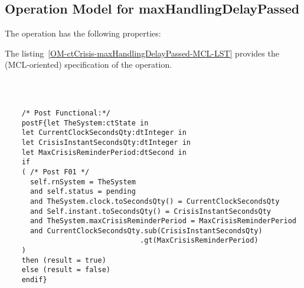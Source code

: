 \subsection{Operation Model for maxHandlingDelayPassed}

\label{OM-maxHandlingDelayPassed}


The  operation has the following properties:

	\begin{operationmodel}



		


	\end{operationmodel}



	\vspace{1cm}
	The listing~\ref{OM-ctCrisis-maxHandlingDelayPassed-MCL-LST} provides the \msrmessir (MCL-oriented) specification of the operation.
	
	\scriptsize
	\vspace{0.5cm}
	\begin{lstlisting}[style=MessirStyle,firstnumber=auto,captionpos=b,caption={\msrmessir (MCL-oriented) specification of the operation \emph{maxHandlingDelayPassed}.},label=OM-ctCrisis-maxHandlingDelayPassed-MCL-LST]

	
	
	/* Post Functional:*/ 
	postF{let TheSystem:ctState in
	let CurrentClockSecondsQty:dtInteger in
	let CrisisInstantSecondsQty:dtInteger in
	let MaxCrisisReminderPeriod:dtSecond in
	if 
	( /* Post F01 */
	  self.rnSystem = TheSystem
	  and self.status = pending
	  and TheSystem.clock.toSecondsQty() = CurrentClockSecondsQty
	  and Self.instant.toSecondsQty() = CrisisInstantSecondsQty
	  and TheSystem.maxCrisisReminderPeriod = MaxCrisisReminderPeriod
	  and CurrentClockSecondsQty.sub(CrisisInstantSecondsQty)
	                            .gt(MaxCrisisReminderPeriod)
	)
	then (result = true)
	else (result = false)
	endif}
	
	
	\end{lstlisting}
	\normalsize 
	
